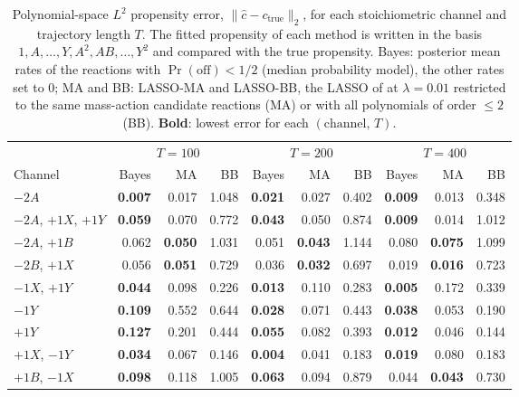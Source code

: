 \begin{table}[htbp]
\centering
\small
\caption{%
  Polynomial-space $L^2$ propensity error, $\|\hat{c} - c_{\mathrm{true}}\|_2$, for each stoichiometric
  channel and trajectory length $T$. The fitted propensity of each method is written in the basis
  $1, A, \dots, Y, A^2, AB, \dots, Y^2$ and compared with the true propensity. Bayes: posterior mean rates of the reactions with
  $\Pr(\text{off})<1/2$ (median probability model), the other rates set to $0$;
  MA and BB: LASSO-MA and LASSO-BB, the LASSO of \cite{siam_Zhang2019} at $\lambda = 0.01$
  restricted to the same mass-action candidate reactions (MA) or with all polynomials of order $\le 2$ (BB).
  \textbf{Bold}: lowest error for each $(\text{channel},\,T)$.
}
\label{tab:comparison-l2}
\setlength{\tabcolsep}{3pt}
\begin{tabular}{l rrr rrr rrr}
\toprule
\multicolumn{1}{c}{} & \multicolumn{3}{c}{$T=100$} & \multicolumn{3}{c}{$T=200$} & \multicolumn{3}{c}{$T=400$} \\
\cmidrule(lr){2-4}\cmidrule(lr){5-7}\cmidrule(lr){8-10}
Channel & Bayes & MA & BB & Bayes & MA & BB & Bayes & MA & BB \\
\midrule
$-2A$ & \textbf{0.007} & 0.017 & 1.048 & \textbf{0.021} & 0.027 & 0.402 & \textbf{0.009} & 0.013 & 0.348 \\
$-2A$, $+1X$, $+1Y$ & \textbf{0.059} & 0.070 & 0.772 & \textbf{0.043} & 0.050 & 0.874 & \textbf{0.009} & 0.014 & 1.012 \\
$-2A$, $+1B$ & 0.062 & \textbf{0.050} & 1.031 & 0.051 & \textbf{0.043} & 1.144 & 0.080 & \textbf{0.075} & 1.099 \\
$-2B$, $+1X$ & 0.056 & \textbf{0.051} & 0.729 & 0.036 & \textbf{0.032} & 0.697 & 0.019 & \textbf{0.016} & 0.723 \\
$-1X$, $+1Y$ & \textbf{0.044} & 0.098 & 0.226 & \textbf{0.013} & 0.110 & 0.283 & \textbf{0.005} & 0.172 & 0.339 \\
$-1Y$ & \textbf{0.109} & 0.552 & 0.644 & \textbf{0.028} & 0.071 & 0.443 & \textbf{0.038} & 0.053 & 0.190 \\
$+1Y$ & \textbf{0.127} & 0.201 & 0.444 & \textbf{0.055} & 0.082 & 0.393 & \textbf{0.012} & 0.046 & 0.144 \\
$+1X$, $-1Y$ & \textbf{0.034} & 0.067 & 0.146 & \textbf{0.004} & 0.041 & 0.183 & \textbf{0.019} & 0.080 & 0.183 \\
$+1B$, $-1X$ & \textbf{0.098} & 0.118 & 1.005 & \textbf{0.063} & 0.094 & 0.879 & 0.044 & \textbf{0.043} & 0.730 \\

\end{tabular}
\end{table}
